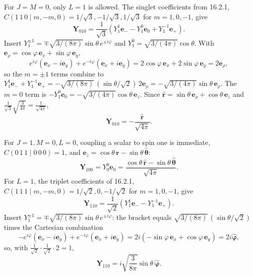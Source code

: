 For $J=M=0$, only $L=1$ is allowed. The singlet coefficients from
16.2.1, $C(1\,1\,0\mid m,-m,0)=1/\sqrt3,-1/\sqrt3,1/\sqrt3$ for
$m=1,0,-1$, give
\[
\mathbf Y_{010}=\frac1{\sqrt3}
(Y_1^1\mathbf e_- -Y_1^0\mathbf e_0+Y_1^{-1}\mathbf e_+).
\]
Insert $Y_1^{\pm1}=\mp\sqrt{3/(8\pi)}\sin\theta\,e^{\pm i\varphi}$
and $Y_1^0=\sqrt{3/(4\pi)}\cos\theta$. With
$\mathbf e_\rho=\cos\varphi\,\mathbf e_x+\sin\varphi\,\mathbf e_y$,
\[
e^{i\varphi}(\mathbf e_x-i\mathbf e_y)
+e^{-i\varphi}(\mathbf e_x+i\mathbf e_y)
=2\cos\varphi\,\mathbf e_x+2\sin\varphi\,\mathbf e_y
=2\mathbf e_\rho,
\]
so the $m=\pm1$ terms combine to
$Y_1^1\mathbf e_-+Y_1^{-1}\mathbf e_+
=-\sqrt{3/(8\pi)}\,(\sin\theta/\sqrt2)\,2\mathbf e_\rho
=-\sqrt{3/(4\pi)}\sin\theta\,\mathbf e_\rho$.
The $m=0$ term is
$-Y_1^0\mathbf e_0=-\sqrt{3/(4\pi)}\cos\theta\,\mathbf e_z$.
Since $\hat{\mathbf r}=\sin\theta\,\mathbf e_\rho+
\cos\theta\,\mathbf e_z$ and
$\frac1{\sqrt3}\sqrt{\frac3{4\pi}}=\frac1{\sqrt{4\pi}}$,
\[
\boxed{\mathbf Y_{010}=-\frac{\hat{\mathbf r}}{\sqrt{4\pi}}}.
\]

For $J=1,M=0,L=0$, coupling a scalar to spin one is immediate,
$C(0\,1\,1\mid0\,0\,0)=1$, and
$\mathbf e_z=\cos\theta\,\hat{\mathbf r}-\sin\theta\,\hat{\boldsymbol\theta}$:
\[
\boxed{\mathbf Y_{100}=Y_0^0\mathbf e_0
=\frac{\cos\theta\,\hat{\mathbf r}
-\sin\theta\,\hat{\boldsymbol\theta}}{\sqrt{4\pi}}}.
\]
For $L=1$, the triplet coefficients of 16.2.1,
$C(1\,1\,1\mid m,-m,0)=1/\sqrt2,0,-1/\sqrt2$ for $m=1,0,-1$, give
\[
\mathbf Y_{110}=\frac1{\sqrt2}
(Y_1^1\mathbf e_- -Y_1^{-1}\mathbf e_+).
\]
Insert $Y_1^{\pm1}=\mp\sqrt{3/(8\pi)}\sin\theta\,e^{\pm i\varphi}$:
the bracket equals
$\sqrt{3/(8\pi)}\,(\sin\theta/\sqrt2)$ times the Cartesian combination
\[
-e^{i\varphi}(\mathbf e_x-i\mathbf e_y)
+e^{-i\varphi}(\mathbf e_x+i\mathbf e_y)
=2i(-\sin\varphi\,\mathbf e_x+\cos\varphi\,\mathbf e_y)
=2i\hat{\boldsymbol\varphi},
\]
so, with $\frac1{\sqrt2}\cdot\frac1{\sqrt2}\cdot2=1$,
\[
\boxed{\mathbf Y_{110}=i\sqrt{\frac3{8\pi}}\sin\theta\,
\hat{\boldsymbol\varphi}}.
\]

